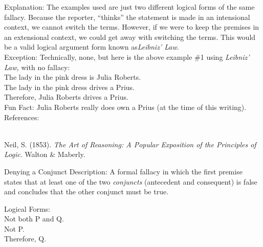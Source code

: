 \documentclass[a4paper,12pt,single,pdftex]{scrartcl}
\begin{document}
    
      Explanation: The examples used are just two different logical forms of the same fallacy.  Because the reporter, “thinks” the statement is made in an intensional context, we cannot switch the terms.  However, if we were to keep the premises in an extensional context, we could get away with switching the terms.  This would be a valid logical argument form known as{\it  Leibniz’ Law}.
    \\

    
      Exception: Technically, none, but here is the above example \#1 using {\it Leibniz’ Law, }with no fallacy:
    \\

    
      The lady in the pink dress is Julia Roberts.
    \\

    
      The lady in the pink dress drives a Prius.
    \\

    
      Therefore, Julia Roberts drives a Prius.
    \\

    
      Fun Fact: Julia Roberts really does own a Prius (at the time of this writing).
    \\

    References:

    
      
        
      \\

      
        
          Neil, S. (1853). {\it The Art of Reasoning: A Popular Exposition of the Principles of Logic}. Walton \& Maberly.
        
      
    
  

Denying a Conjunct
    Description: A formal fallacy in which the first premise states that at least one of the two {\it conjuncts} (antecedent and consequent) is false and concludes that the other conjunct must be true.

    
      Logical Forms:
    \\

    
      Not both P and Q.
    \\

    
      Not P.
    \\

    
      Therefore, Q.
    \\

    
       
    \\
\end{document}
